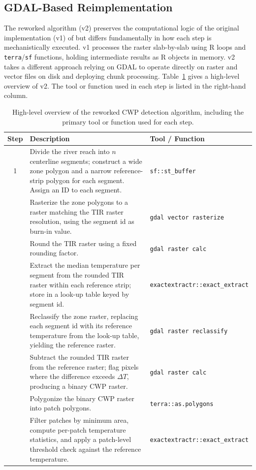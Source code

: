 \subsection{GDAL-Based Reimplementation}

The reworked algorithm (v2) preserves the computational logic of the original 
implementation (v1) of \citet{tonolla_thermische-kartographie_2026} but differs 
fundamentally in how each step is mechanistically executed. v1 processes 
the raster slab-by-slab using R loops and \texttt{terra}/\texttt{sf} functions, 
holding intermediate results as R objects in memory. v2 takes a different approach relying on
GDAL \citep{rouault_2026_20083023} to operate directly on raster and 
vector files on disk and deploying chunk processing. Table~\ref{tab:cwp_pseudocode} gives a high-level 
overview of v2. The tool or function used in each step is listed in the 
right-hand column.


\begin{table}[H]
	\centering
	\caption{High-level overview of the reworked CWP detection algorithm, 
		including the primary tool or function used for each step.}
	\label{tab:cwp_pseudocode}
	\begin{tabular}{@{}c p{7.5cm} p{4cm}@{}}
		\toprule
		\textbf{Step} & \textbf{Description} & \textbf{Tool / Function} \\
		\midrule
		1 & Divide the river reach into $n$ centerline segments; construct a 
		wide zone polygon and a narrow reference-strip polygon for each 
		segment. Assign an ID to each segment. & \texttt{sf::st\_buffer} \\
		\addlinespace
		2 & Rasterize the zone polygons to a raster matching the TIR raster 
		resolution, using the segment id as burn-in value. & 
		\texttt{gdal vector rasterize} \\
		\addlinespace
		3 & Round the TIR raster using a fixed rounding factor. & 
		\texttt{gdal raster calc} \\
		\addlinespace
		4 & Extract the median temperature per segment from the rounded TIR 
		raster within each reference strip; store in a look-up table keyed 
		by segment id. & \texttt{exactextractr::exact\_extract} \\
		\addlinespace
		5 & Reclassify the zone raster, replacing each segment id with its 
		reference temperature from the look-up table, yielding the reference 
		raster. & \texttt{gdal raster reclassify} \\
		\addlinespace
		6 & Subtract the rounded TIR raster from the reference raster; flag 
		pixels where the difference exceeds $\Delta T$, producing a binary 
		CWP raster. & \texttt{gdal raster calc} \\
		\addlinespace
		7 & Polygonize the binary CWP raster into patch polygons. & 
		\texttt{terra::as.polygons} \\
		\addlinespace
		8 & Filter patches by minimum area, compute per-patch temperature 
		statistics, and apply a patch-level threshold check against the 
		reference temperature. & \texttt{exactextractr::exact\_extract} \\
		\bottomrule
	\end{tabular}
\end{table}

